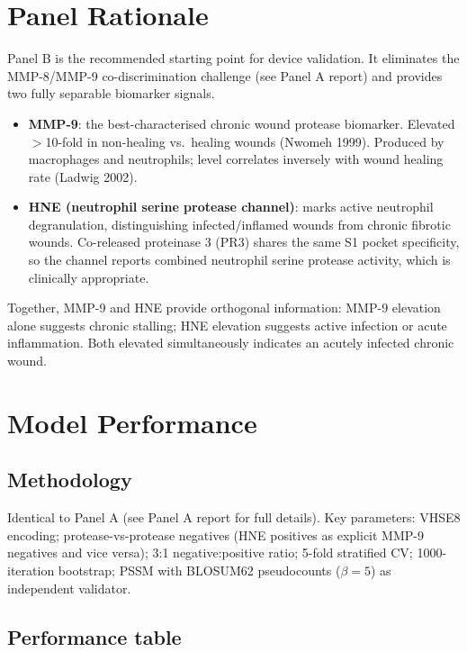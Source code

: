 \documentclass[10pt,a4paper]{article}
\begin{document}
\section{Panel Rationale}

Panel B is the recommended starting point for device validation.
It eliminates the MMP-8/MMP-9 co-discrimination challenge (see Panel A
report) and provides two fully separable biomarker signals.

\begin{itemize}[topsep=2pt,itemsep=1pt,leftmargin=*]
  \item \textbf{MMP-9}: the best-characterised chronic wound protease
    biomarker.  Elevated $>$10-fold in non-healing vs.\ healing wounds
    (Nwomeh 1999).  Produced by macrophages and neutrophils; level
    correlates inversely with wound healing rate (Ladwig 2002).
  \item \textbf{HNE (neutrophil serine protease channel)}: marks active
    neutrophil degranulation, distinguishing infected/inflamed wounds from
    chronic fibrotic wounds.  Co-released proteinase 3 (PR3) shares the
    same S1 pocket specificity, so the channel reports combined
    neutrophil serine protease activity, which is clinically appropriate.
\end{itemize}

Together, MMP-9 and HNE provide orthogonal information: MMP-9 elevation
alone suggests chronic stalling; HNE elevation suggests active infection
or acute inflammation.  Both elevated simultaneously indicates an acutely
infected chronic wound.

\section{Model Performance}

\subsection{Methodology}

Identical to Panel A (see Panel A report for full details).
Key parameters: VHSE8 encoding; protease-vs-protease negatives
(HNE positives as explicit MMP-9 negatives and vice versa); 3:1
negative:positive ratio; 5-fold stratified CV; 1000-iteration bootstrap;
PSSM with BLOSUM62 pseudocounts ($\beta = 5$) as independent validator.

\subsection{Performance table}
\end{document}
